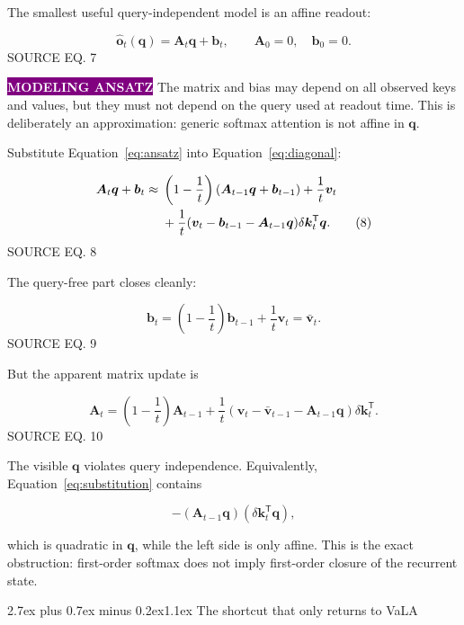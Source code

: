 \documentclass[11pt]{article}
\makeatletter
\newcommand{\vect}[1]{\bm{#1}}
\newcommand{\trans}{^{\mathsf T}}
\newcommand{\sourceeq}[1]{\hfill{\sffamily\scriptsize\color{Muted}SOURCE EQ. #1}}
\newcommand{\badge}[2]{%
  \begingroup\setlength{\fboxsep}{3.5pt}%
  \colorbox{#1}{\textcolor{white}{\sffamily\bfseries\scriptsize #2}}%
  \endgroup
}
\renewcommand\section{\@startsection{section}{1}{0pt}%
  {2.7ex plus 0.7ex minus 0.2ex}{1.1ex}%
  {\normalfont\sffamily\Large\bfseries\color{Ink}}}
\makeatother
\begin{document}
The smallest useful query-independent model is an affine readout:

\begin{equation}
  \widehat{\vect o}_t(\vect q)=\vect A_t\vect q+\vect b_t,
  \qquad \vect A_0=0,\quad\vect b_0=0.
  \tag{7}\label{eq:ansatz}
\end{equation}
\sourceeq{7}

\badge{Purple}{MODELING ANSATZ} The matrix and bias may depend on all observed
keys and values, but they must not depend on the query used at readout time.
This is deliberately an approximation: generic softmax attention is not affine
in $\vect q$.

Substitute Equation~\eqref{eq:ansatz} into Equation~\eqref{eq:diagonal}:

\begin{align}
  \vect A_t\vect q+\vect b_t
  \approx{}&\left(1-\frac1t\right)
    (\vect A_{t-1}\vect q+\vect b_{t-1})+\frac1t\vect v_t \notag\\
  &+\frac1t
    (\vect v_t-\vect b_{t-1}-\vect A_{t-1}\vect q)
    \delta\vect k_t\trans\vect q.
  \tag{8}\label{eq:substitution}
\end{align}
\sourceeq{8}

The query-free part closes cleanly:

\begin{equation}
  \vect b_t=\left(1-\frac1t\right)\vect b_{t-1}+\frac1t\vect v_t
  =\bar{\vect v}_t.
  \tag{9}\label{eq:bmean}
\end{equation}
\sourceeq{9}

But the apparent matrix update is

\begin{equation}
  \vect A_t=\left(1-\frac1t\right)\vect A_{t-1}
  +\frac1t(\vect v_t-\bar{\vect v}_{t-1}
  -\vect A_{t-1}\vect q)\delta\vect k_t\trans.
  \tag{10}\label{eq:notclosed}
\end{equation}
\sourceeq{10}

The visible $\vect q$ violates query independence. Equivalently,
Equation~\eqref{eq:substitution} contains

\[
  -(\vect A_{t-1}\vect q)(\delta\vect k_t\trans\vect q),
\]

which is quadratic in $\vect q$, while the left side is only affine. This is
the exact obstruction: first-order softmax does not imply first-order closure
of the recurrent state.

\section{The shortcut that only returns to VaLA}
\end{document}
